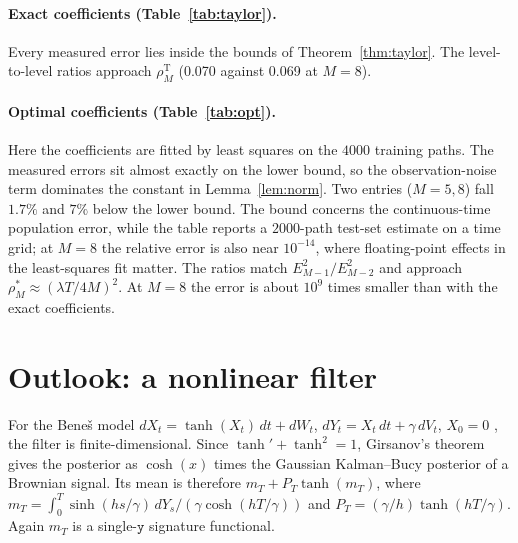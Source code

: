 \documentclass[11pt]{article}
\theoremstyle{remark}
\newcommand{\wy}{\mathtt y}
\begin{document}
\paragraph{Exact coefficients (Table~\ref{tab:taylor}).} Every measured error lies inside the bounds
of Theorem~\ref{thm:taylor}. The level-to-level ratios approach $\rho^{\mathrm T}_M$ (0.070 against
0.069 at $M=8$).

\paragraph{Optimal coefficients (Table~\ref{tab:opt}).} Here the coefficients are fitted by least
squares on the $4000$ training paths. The measured errors sit almost exactly on the lower bound, so
the observation-noise term dominates the constant in Lemma~\ref{lem:norm}. Two entries ($M=5,8$) fall
$1.7\%$ and $7\%$ below the lower bound. The bound concerns the continuous-time population error,
while the table reports a $2000$-path test-set estimate on a time grid; at $M=8$ the relative error
is also near $10^{-14}$, where floating-point effects in the least-squares fit matter. The ratios
match $E_{M-1}^2/E_{M-2}^2$ and approach $\rho^*_M\approx(\lambda T/4M)^2$. At $M=8$ the error is
about $10^{9}$ times smaller than with the exact coefficients.

\section{Outlook: a nonlinear filter}\label{sec:outlook}

For the Bene\v{s} model $dX_t=\tanh(X_t)\,dt+dW_t$, $dY_t=X_t\,dt+\gamma\,dV_t$, $X_0=0$
\citep{benes1981}, the filter is finite-dimensional. Since $\tanh'+\tanh^2=1$, Girsanov's theorem
gives the posterior as $\cosh(x)$ times the Gaussian Kalman--Bucy posterior of a Brownian signal.
Its mean is therefore $m_T+P_T\tanh(m_T)$, where $m_T=\int_0^T\sinh(hs/\gamma)\,dY_s/(\gamma\cosh(hT/\gamma))$
and $P_T=(\gamma/h)\tanh(hT/\gamma)$. Again $m_T$ is a single-$\wy$ signature functional.
\end{document}

